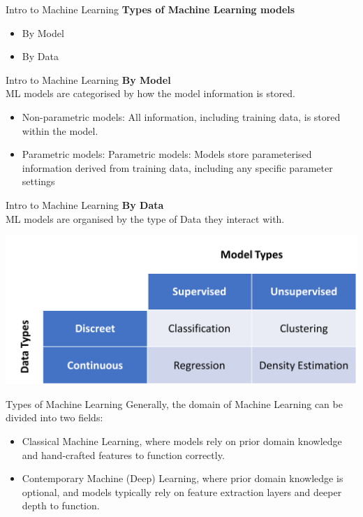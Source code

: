 \documentclass{beamer}
\begin{document}
\begin{frame}[fragile]{Intro to Machine Learning}
    \textbf{Types of Machine Learning models}\\
    \begin{itemize}
        \item By Model
        \item By Data
    \end{itemize}
\end{frame}

\begin{frame}[fragile]{Intro to Machine Learning}
    \textbf{By Model}\\
    ML models are categorised by how the model information is stored.
    \begin{itemize}
        \item Non-parametric models: All information, including training data, is stored within the model.
        \item Parametric models: Parametric models: Models store parameterised information derived from training data, including any specific parameter settings
    \end{itemize}
\end{frame}

\begin{frame}[fragile]{Intro to Machine Learning}
    \textbf{By Data}\\
    ML models are organised by the type of Data they interact with.
    \begin{center}
        \includegraphics[width=\textwidth,height=\textheight,keepaspectratio]{figures/By-Data.png}
    \end{center}
\end{frame}

\begin{frame}[fragile]{Types of Machine Learning}
    Generally, the domain of Machine Learning can be divided into two fields:
    \begin{itemize}
        \item Classical Machine Learning, where models rely on prior domain knowledge and hand-crafted features to function correctly.
        \item Contemporary Machine (Deep) Learning, where prior domain knowledge is optional, and models typically rely on feature extraction layers and deeper depth to function.
    \end{itemize}
\end{frame}
\end{document}
